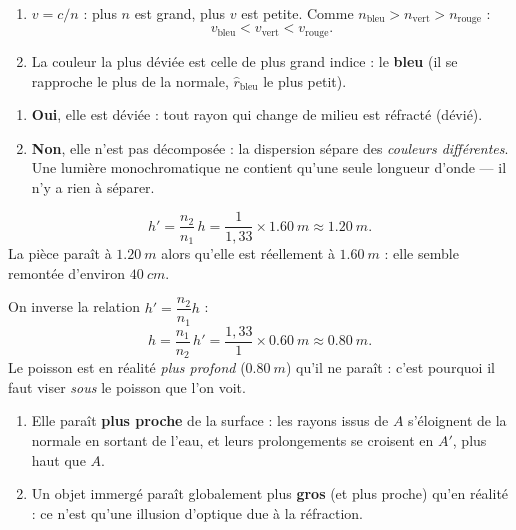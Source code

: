 \documentclass[11pt,a4paper]{article}
\begin{document}
\begin{corrige}
\begin{enumerate}[label=\alph*)]
  \item $v=c/n$ : plus $n$ est grand, plus $v$ est petite. Comme $n_{\text{bleu}}>n_{\text{vert}}>n_{\text{rouge}}$ :
        \[ v_{\text{bleu}}<v_{\text{vert}}<v_{\text{rouge}}. \]
  \item La couleur la plus déviée est celle de plus grand indice : le \textbf{bleu} (il se rapproche
        le plus de la normale, $\hat r_{\text{bleu}}$ le plus petit).
\end{enumerate}
\end{corrige}

\begin{corrige}
\begin{enumerate}[label=\alph*)]
  \item \textbf{Oui}, elle est déviée : tout rayon qui change de milieu est réfracté (dévié).
  \item \textbf{Non}, elle n'est pas décomposée : la dispersion sépare des \emph{couleurs différentes}.
        Une lumière monochromatique ne contient qu'une seule longueur d'onde — il n'y a rien à séparer.
\end{enumerate}
\end{corrige}

\begin{corrige}
\[ h'=\frac{n_2}{n_1}\,h=\frac{1}{1{,}33}\times\qty{1.60}{m}\approx\qty{1.20}{m}. \]
La pièce paraît à $\qty{1.20}{m}$ alors qu'elle est réellement à $\qty{1.60}{m}$ : elle semble
remontée d'environ $\qty{40}{cm}$.
\end{corrige}

\begin{corrige}
On inverse la relation $h'=\dfrac{n_2}{n_1}h$ :
\[ h=\frac{n_1}{n_2}\,h'=\frac{1{,}33}{1}\times\qty{0.60}{m}\approx\qty{0.80}{m}. \]
Le poisson est en réalité \emph{plus profond} ($\qty{0.80}{m}$) qu'il ne paraît : c'est pourquoi il
faut viser \emph{sous} le poisson que l'on voit.
\end{corrige}

\begin{corrige}
\begin{enumerate}[label=\alph*)]
  \item Elle paraît \textbf{plus proche} de la surface : les rayons issus de $A$ s'éloignent de la
        normale en sortant de l'eau, et leurs prolongements se croisent en $A'$, plus haut que $A$.
  \item Un objet immergé paraît globalement plus \textbf{gros} (et plus proche) qu'en réalité : ce
        n'est qu'une illusion d'optique due à la réfraction.
\end{enumerate}
\end{corrige}
\end{document}
